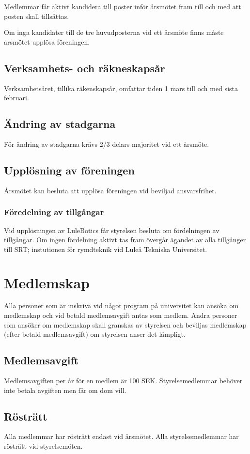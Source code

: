\documentclass{article}
\begin{document}
Medlemmar får aktivt kandidera till poster inför årsmötet fram till och med att posten skall tillsättas.

Om inga kandidater till de tre huvudposterna vid ett årsmöte finns måste årsmötet upplösa föreningen.

\subsection{Verksamhets- och räkneskapsår}
Verksamhetsåret, tillika räkenskapsår, omfattar tiden 1 mars till och med sista februari.

\subsection{Ändring av stadgarna}
För ändring av stadgarna krävs 2/3 delars majoritet vid ett årsmöte.

\subsection{Upplösning av föreningen}
Årsmötet kan besluta att upplösa föreningen vid beviljad ansvarsfrihet.

\subsubsection{Föredelning av tillgångar}
Vid upplösningen av LuleBotics får styrelsen besluta om fördelningen av tillgångar. Om ingen fördelning aktivt tas fram övergår ägandet av alla tillgånger till SRT; instutionen för rymdteknik vid Luleå Tekniska Universitet.


\section{Medlemskap}
Alla personer som är inskriva vid något program på universitet kan ansöka om medlemskap och vid betald medlemsavgift antas som medlem. Andra personer som ansöker om medlemskap skall granskas av styrelsen och beviljas medlemskap (efter betald medlemsavgift) om styrelsen anser det lämpligt.
\subsection{Medlemsavgift}
Medlemsavgiften per år för en medlem är 100 SEK. Styrelsemedlemmar behöver inte betala avgiften men får om dom vill.

\subsection{Rösträtt}
Alla medlemmar har rösträtt endast vid årsmötet. Alla styrelsemedlemmar har rösträtt vid styrelsemöten.
\end{document}
